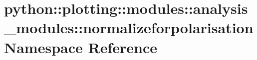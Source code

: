 \hypertarget{namespacepython_1_1plotting_1_1modules_1_1analysis__modules_1_1normalizeforpolarisation}{
\section{python::plotting::modules::analysis\_\-modules::normalizeforpolarisation Namespace Reference}
\label{namespacepython_1_1plotting_1_1modules_1_1analysis__modules_1_1normalizeforpolarisation}
}
